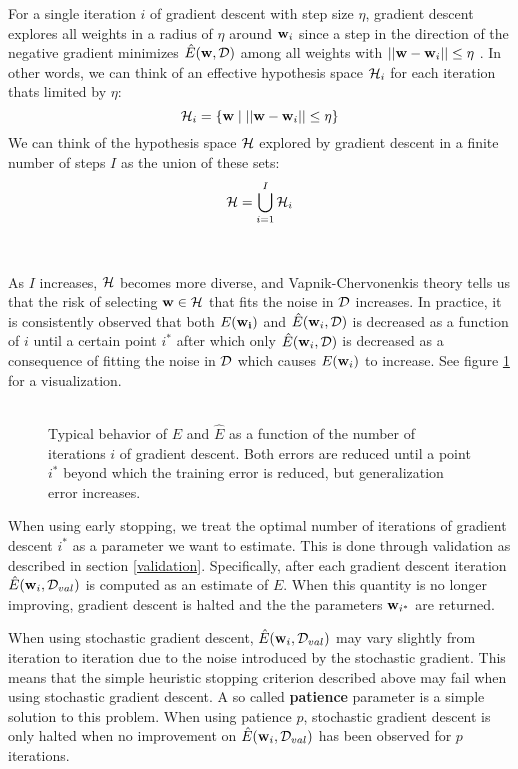 For a single iteration $i$ of gradient descent with step size $\eta$, gradient descent explores all weights in a radius of $\eta$ around $\mathbf{w}_i$ since a step in the direction of the negative gradient minimizes $\hat{E}(\mathbf{w}, \mathcal{D})$ among all weights with $||\mathbf{w} - \mathbf{w}_i|| \leq \eta$ \citep{yaser12}. In other words, we can think of an effective hypothesis space $\mathcal{H}_i$ for each iteration thats limited by $\eta$:
$$
\mathcal{H}_i = \{\mathbf{w} \mid ||\mathbf{w} - \mathbf{w}_i|| \leq \eta\}
$$
We can think of the hypothesis space $\mathcal{H}$ explored by gradient descent in a finite number of steps $I$ as the union of these sets:
$$
\mathcal{H} = \bigcup\limits_{i = 1}^I \mathcal{H}_i
$$
\\\\
As $I$ increases, $\mathcal{H}$ becomes more diverse, and Vapnik-Chervonenkis theory tells us that the risk of selecting $\mathbf{w} \in \mathcal{H}$ that fits the noise in $\mathcal{D}$ increases. In practice, it is consistently observed that both $E(\mathbf{w_i})$ and $\hat{E}(\mathbf{w}_i, \mathcal{D})$ is decreased as a function of $i$ until a certain point $i^*$ after which only $\hat{E}(\mathbf{w}_i, \mathcal{D})$ is decreased as a consequence of fitting the noise in $\mathcal{D}$ which causes $E(\mathbf{w}_i)$ to increase. See figure \ref{early_stopping} for a visualization.
\\\\
\begin{figure}
	
	\caption{Typical behavior of $E$ and $\hat{E}$ as a function of the number of iterations $i$ of gradient descent. Both errors are reduced until a point $i^*$ beyond which the training error is reduced, but generalization error increases.}
	\label{early_stopping}
\end{figure}
When using early stopping, we treat the optimal number of iterations of gradient descent $i^*$ as a parameter we want to estimate. This is done through validation as described in section \ref{validation}. Specifically, after each gradient descent iteration $\hat{E}(\mathbf{w}_i, \mathcal{D}_{val})$ is computed as an estimate of $E$. When this quantity is no longer improving, gradient descent is halted and the the parameters $\mathbf{w}_{i^*}$ are returned.

When using stochastic gradient descent, $\hat{E}(\mathbf{w}_i, \mathcal{D}_{val})$ may vary slightly from iteration to iteration due to the noise introduced by the stochastic gradient. This means that the simple heuristic stopping criterion described above may fail when using stochastic gradient descent. A so called \textbf{patience} parameter is a simple solution to this problem. When using patience $p$, stochastic gradient descent is only halted when no improvement on $\hat{E}(\mathbf{w}_i, \mathcal{D}_{val})$ has been observed for $p$ iterations.